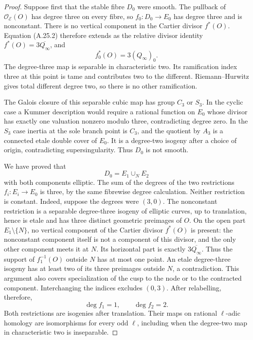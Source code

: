 \begin{proof}
Suppose first that the stable fibre $D_0$ were smooth.
The pullback of $\mathcal O_{\mathcal E}(O)$ has degree
three on every fibre, so $f_0:D_0\to E_0$ has degree
three and is nonconstant. There is no vertical
component in the Cartier divisor $f^*(O)$.
Equation (A.25.2) therefore extends as the relative
divisor identity $f^*(O)=3\overline{Q_\infty}$, and
\[
                         f_0^*(O)=3(Q_\infty)_0.
\]
The degree-three map is separable in characteristic
two. Its ramification index three at this point is
tame and contributes two to the different.
Riemann--Hurwitz gives total different degree two,
so there is no other ramification.

The Galois closure of this separable cubic map has
group $C_3$ or $S_3$. In the cyclic case a Kummer
description would require a rational function on
$E_0$ whose divisor has exactly one valuation
nonzero modulo three, contradicting degree zero.
In the $S_3$ case inertia at the sole branch point
is $C_3$, and the quotient by $A_3$ is a connected
etale double cover of $E_0$. It is a degree-two
isogeny after a choice of origin, contradicting
supersingularity. Thus $D_0$ is not smooth.

We have proved that
\[
                  D_0=E_1\cup_N E_2                    \tag{A.25.3}
\]
with both components elliptic. The sum of the degrees
of the two restrictions $f_i:E_i\to E_0$ is three,
by the same fibrewise degree calculation. Neither
restriction is constant. Indeed, suppose the degrees
were $(3,0)$. The nonconstant restriction is a
separable degree-three isogeny of elliptic curves,
up to translation, hence is etale and has three
distinct geometric preimages of $O$.
On the open part $E_1\setminus\{N\}$, no vertical
component of the Cartier divisor $f^*(O)$ is present:
the nonconstant component itself is not a component
of this divisor, and the only other component meets
it at $N$. Its horizontal part is exactly
$3\overline{Q_\infty}$. Thus the support of
$f_1^{-1}(O)$ outside $N$ has at most one point.
An etale degree-three isogeny has at least two of
its three preimages outside $N$, a contradiction.
This argument also covers specialization of the
cusp to the node or to the contracted component.
Interchanging the indices excludes $(0,3)$.
After relabelling, therefore,
\[
                         \deg f_1=1,\qquad \deg f_2=2.
                                                        \tag{A.25.4}
\]
Both restrictions are isogenies after translation.
Their maps on rational $\ell$-adic homology are
isomorphisms for every odd $\ell$, including when
the degree-two map in characteristic two is
inseparable.


\end{proof}
